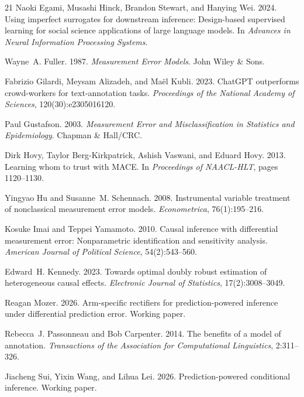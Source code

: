 \documentclass[11pt,a4paper]{article}
\begin{document}
\begin{thebibliography}{21}
Naoki Egami, Musashi Hinck, Brandon Stewart, and Hanying Wei.
2024.
Using imperfect surrogates for downstream inference: Design-based supervised learning for social science applications of large language models.
In {\em Advances in Neural Information Processing Systems}.

Wayne~A. Fuller.
1987.
{\em Measurement Error Models}.
John Wiley \& Sons.

Fabrizio Gilardi, Meysam Alizadeh, and Ma{\"e}l Kubli.
2023.
{ChatGPT} outperforms crowd-workers for text-annotation tasks.
{\em Proceedings of the National Academy of Sciences}, 120(30):e2305016120.

Paul Gustafson.
2003.
{\em Measurement Error and Misclassification in Statistics and Epidemiology}.
Chapman \& Hall/CRC.

Dirk Hovy, Taylor Berg-Kirkpatrick, Ashish Vaswani, and Eduard Hovy.
2013.
Learning whom to trust with {MACE}.
In {\em Proceedings of NAACL-HLT}, pages 1120--1130.

Yingyao Hu and Susanne~M. Schennach.
2008.
Instrumental variable treatment of nonclassical measurement error models.
{\em Econometrica}, 76(1):195--216.

Kosuke Imai and Teppei Yamamoto.
2010.
Causal inference with differential measurement error: Nonparametric identification and sensitivity analysis.
{\em American Journal of Political Science}, 54(2):543--560.

Edward~H. Kennedy.
2023.
Towards optimal doubly robust estimation of heterogeneous causal effects.
{\em Electronic Journal of Statistics}, 17(2):3008--3049.

Reagan Mozer.
2026.
Arm-specific rectifiers for prediction-powered inference under differential prediction error.
Working paper.

Rebecca~J. Passonneau and Bob Carpenter.
2014.
The benefits of a model of annotation.
{\em Transactions of the Association for Computational Linguistics}, 2:311--326.

Jiacheng Sui, Yixin Wang, and Lihua Lei.
2026.
Prediction-powered conditional inference.
Working paper.


\end{thebibliography}
\end{document}
